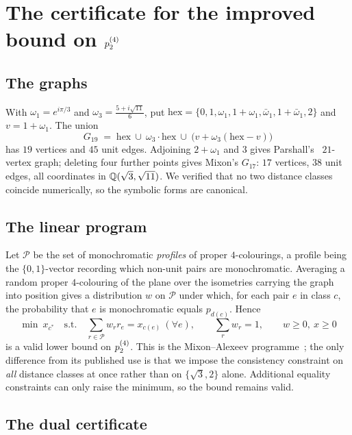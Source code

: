 \section{The certificate for the improved bound on $p^{(4)}_{2}$}
\label{sec:certificate}

\subsection{The graphs}

With $\omega_1=e^{i\pi/3}$ and $\omega_3=\tfrac{5+i\sqrt{11}}{6}$, put
$\mathrm{hex}=\{0,1,\omega_1,1+\omega_1,\bar\omega_1,1+\bar\omega_1,2\}$ and
$v=1+\omega_1$. The union
\[
G_{19}\;=\;\mathrm{hex}\ \cup\ \omega_3\!\cdot\!\mathrm{hex}\ \cup\
\big(v+\omega_3(\mathrm{hex}-v)\big)
\]
has $19$ vertices and $45$ unit edges. Adjoining $2+\omega_1$ and $3$ gives
Parshall's~\cite{Polymath16} $21$-vertex graph; deleting four further points gives Mixon's
$G_{17}$: $17$ vertices, $38$ unit edges, all coordinates in
$\mathbb{Q}(\sqrt3,\sqrt{11})$. We verified that no two distance classes coincide
numerically, so the symbolic forms are canonical.

\subsection{The linear program}

Let $\mathcal{P}$ be the set of monochromatic \emph{profiles} of proper
$4$-colourings, a profile being the $\{0,1\}$-vector recording which non-unit
pairs are monochromatic. Averaging a random proper $4$-colouring of the plane
over the isometries carrying the graph into position gives a distribution $w$ on
$\mathcal{P}$ under which, for each pair $e$ in class $c$, the probability that
$e$ is monochromatic equals $p_{d(c)}$. Hence
\[
\min\ x_{c^*}\quad\text{s.t.}\quad
\sum_{r\in\mathcal{P}}w_r r_e = x_{c(e)}\ (\forall e),\qquad
\sum_r w_r=1,\qquad w\ge0,\ x\ge0
\]
is a valid lower bound on $p^{(4)}_{2}$. This is the Mixon--Alexeev programme~\cite{Polymath16}; the
only difference from its published use is that we impose the consistency
constraint on \emph{all} distance classes at once rather than on
$\{\sqrt3,2\}$ alone. Additional equality constraints can only raise the
minimum, so the bound remains valid.

\subsection{The dual certificate}

